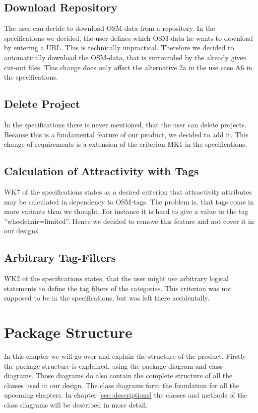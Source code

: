 \documentclass[letterpaper,10pt,english]{sphinxmanual}
\begin{document}
\section*{Download Repository}
The user can decide to download OSM-data from a repository. In the specifications we decided, the user defines which OSM-data he wants to download by entering a URL. This is technically unpractical. Therefore we decided to automatically download the OSM-data, that is surrounded by the already given cut-out files. This change does only affect the alternative 2a in the use case A6 in the specifications.

\section*{Delete Project}
In the specifications there is never mentioned, that the user can delete projects. Because this is a fundamental feature of our product, we decided to add it. This change of requirements is a extension of the criterion MK1 in the specifications.

\section*{Calculation of Attractivity with Tags}
WK7 of the specifications states as a desired criterion that attractivity attributes may be calculated in dependency to OSM-tags. The problem is, that tags come in more variants than we thought. For instance it is hard to give a value to the tag ''wheelchair=limited''. Hence we decided to remove this feature and not cover it in our designs.

\section*{Arbitrary Tag-Filters}
WK2 of the specifications states, that the user might use arbitrary logical statements to define the tag filters of the categories. This criterion was not supposed to be in the specifications, but was left there accidentally.


\newpage%


\chapter{Package Structure}
\label{\detokenize{index:package-structure}}
\sphinxstepscope
In this chapter we will go over and explain the structure of the product. Firstly the package structure is explained, using the  package-diagram and class-diagrams. Those diagrams do also contain the complete structure of all the classes used in our design. The class diagrams form the foundation for all the upcoming chapters. In chapter \ref{sec::descriptions} the classes and methods of the class diagrams will be described in more detail.
\end{document}
